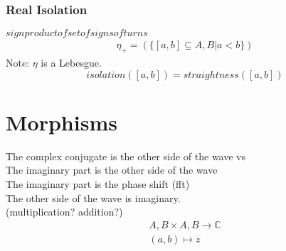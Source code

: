 \documentclass{report}
\begin{document}
\subsection{Real Isolation}
$sign product of set of signs of turns$\\
\begin{align}
\eta_{+}=(\{[a,b] \subseteq A,B \vert a<b\})
\end{align}
Note: $\eta$ is a Lebesgue.
\begin{equation}
isolation([a,b])=straightness([a,b])
\end{equation}

\chapter{Morphisms}

The complex conjugate is the other side of the wave vs\\
The imaginary part is the other side of the wave\\
The imaginary part is the phase shift (fft)\\
The other side of the wave is imaginary.\\
(multiplication? addition?)
\begin{align}
A,B \times A,B \rightarrow \mathbb{C}\\
(a,b) \mapsto z\\
\end{align}
\end{document}
